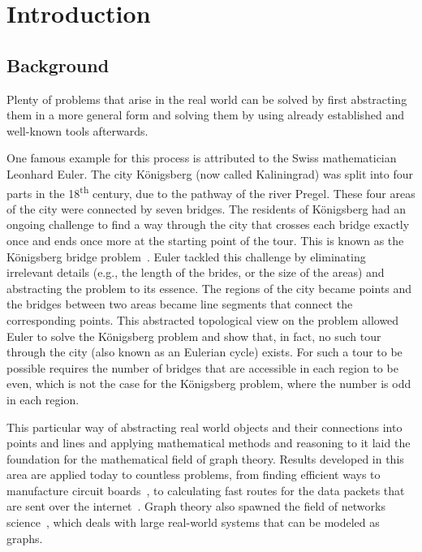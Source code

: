 \chapter{Introduction}
\label{cha:introduction}


\section{Background}
\label{sec:background}

Plenty of problems that arise in the real world can be solved by first abstracting them in a more general form and solving them by using already established and well-known tools afterwards.

One famous example for this process is attributed to the Swiss mathematician Leonhard Euler.
The city Königsberg (now called Kaliningrad) was split into four parts in the 18\textsuperscript{th} century, due to the pathway of the river Pregel.
These four areas of the city were connected by seven bridges.
The residents of Königsberg had an ongoing challenge to find a way through the city that crosses each bridge exactly once and ends once more at the starting point of the tour.
This is known as the Königsberg bridge problem~\cite{Paoletti2011, Cook2012}.
Euler tackled this challenge by eliminating irrelevant details (e.g., the length of the brides, or the size of the areas) and abstracting the problem to its essence.
The regions of the city became points and the bridges between two areas became line segments that connect the corresponding points.
This abstracted topological view on the problem allowed Euler to solve the Königsberg problem and show that, in fact, no such tour through the city (also known as an Eulerian cycle) exists.
For such a tour to be possible requires the number of bridges that are accessible in each region to be even, which is not the case for the Königsberg problem, where the number is odd in each region.

This particular way of abstracting real world objects and their connections into points and lines and applying mathematical methods and reasoning to it laid the foundation for the mathematical field of graph theory.
Results developed in this area are applied today to countless problems, from finding efficient ways to manufacture circuit boards~\cite{Cook2012}, to calculating fast routes for the data packets that are sent over the internet~\cite{Wang1999}.
Graph theory also spawned the field of networks science~\cite{Newman2010}, which deals with large real-world systems that can be modeled as graphs.

